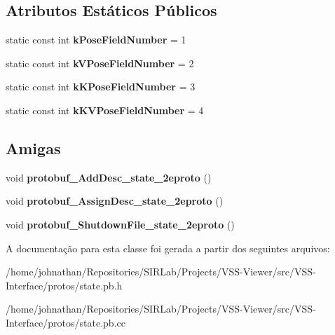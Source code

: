 \subsection*{Atributos Estáticos Públicos}
\begin{DoxyCompactItemize}
\item 
static const int {\bfseries k\+Pose\+Field\+Number} = 1\hypertarget{classvss__state_1_1Ball__State_aa0d51eebda087326095eff02cc80481c}{}\label{classvss__state_1_1Ball__State_aa0d51eebda087326095eff02cc80481c}

\item 
static const int {\bfseries k\+V\+Pose\+Field\+Number} = 2\hypertarget{classvss__state_1_1Ball__State_aa9df3d7a047296c119dfc35ae5e86b54}{}\label{classvss__state_1_1Ball__State_aa9df3d7a047296c119dfc35ae5e86b54}

\item 
static const int {\bfseries k\+K\+Pose\+Field\+Number} = 3\hypertarget{classvss__state_1_1Ball__State_a31603cacf64917d3088585f33290114a}{}\label{classvss__state_1_1Ball__State_a31603cacf64917d3088585f33290114a}

\item 
static const int {\bfseries k\+K\+V\+Pose\+Field\+Number} = 4\hypertarget{classvss__state_1_1Ball__State_a8d49de5cec51b6a22e828da61fa8810b}{}\label{classvss__state_1_1Ball__State_a8d49de5cec51b6a22e828da61fa8810b}

\end{DoxyCompactItemize}
\subsection*{Amigas}
\begin{DoxyCompactItemize}
\item 
void {\bfseries protobuf\+\_\+\+Add\+Desc\+\_\+state\+\_\+2eproto} ()\hypertarget{classvss__state_1_1Ball__State_aab1a2c258f8122a403a979ff57e2a706}{}\label{classvss__state_1_1Ball__State_aab1a2c258f8122a403a979ff57e2a706}

\item 
void {\bfseries protobuf\+\_\+\+Assign\+Desc\+\_\+state\+\_\+2eproto} ()\hypertarget{classvss__state_1_1Ball__State_a57d9367bc8a7a94ead11d11194cca1b6}{}\label{classvss__state_1_1Ball__State_a57d9367bc8a7a94ead11d11194cca1b6}

\item 
void {\bfseries protobuf\+\_\+\+Shutdown\+File\+\_\+state\+\_\+2eproto} ()\hypertarget{classvss__state_1_1Ball__State_a4e6dc5e8e72799859c4e9556d090e57d}{}\label{classvss__state_1_1Ball__State_a4e6dc5e8e72799859c4e9556d090e57d}

\end{DoxyCompactItemize}


A documentação para esta classe foi gerada a partir dos seguintes arquivos\+:\begin{DoxyCompactItemize}
\item 
/home/johnathan/\+Repositories/\+S\+I\+R\+Lab/\+Projects/\+V\+S\+S-\/\+Viewer/src/\+V\+S\+S-\/\+Interface/protos/state.\+pb.\+h\item 
/home/johnathan/\+Repositories/\+S\+I\+R\+Lab/\+Projects/\+V\+S\+S-\/\+Viewer/src/\+V\+S\+S-\/\+Interface/protos/state.\+pb.\+cc\end{DoxyCompactItemize}
